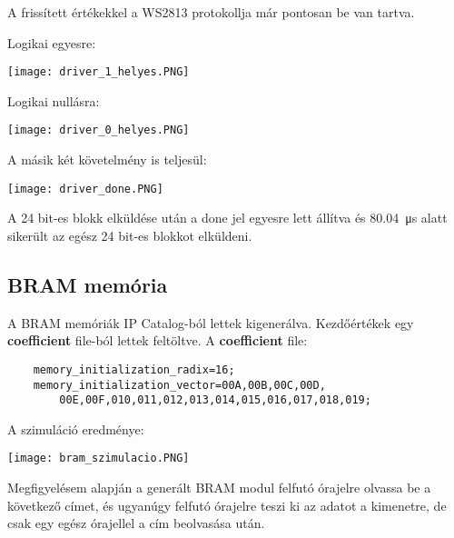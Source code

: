 \tab A frissített értékekkel a WS2813 protokollja már pontosan be van tartva.

\tab Logikai egyesre:

\texttt{[image: driver\_1\_helyes.PNG]}

\tab Logikai nullásra:

\texttt{[image: driver\_0\_helyes.PNG]}

\tab A másik két követelmény is teljesül:

\texttt{[image: driver\_done.PNG]}

\tab A 24 bit-es blokk elküldése után a done jel egyesre lett állítva és \SI{80.04}{\micro\second} alatt sikerült az egész 24 bit-es blokkot elküldeni.


\subsection{BRAM memória}

\tab A BRAM memóriák IP Catalog-ból lettek kigenerálva\cite{vhdlguru2010bram}. Kezdőértékek egy \textbf{coefficient} file-ból lettek feltöltve\cite{vhdlguru2010bramcoe}.
A \textbf{coefficient} file:
\begin{verbatim}
	memory_initialization_radix=16;
	memory_initialization_vector=00A,00B,00C,00D,
		00E,00F,010,011,012,013,014,015,016,017,018,019;
\end{verbatim}

A szimuláció eredménye:

\texttt{[image: bram\_szimulacio.PNG]}

Megfigyelésem alapján a generált BRAM modul felfutó órajelre olvassa be a következő címet, és ugyanúgy felfutó órajelre teszi ki az adatot a kimenetre, de csak egy egész órajellel a cím beolvasása után.
